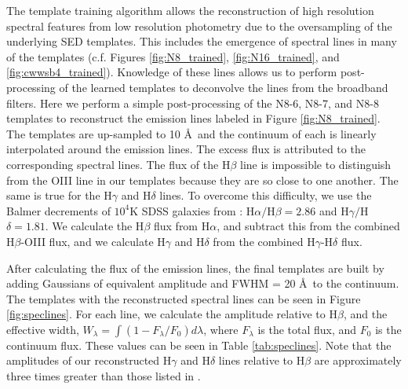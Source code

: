The template training algorithm allows the reconstruction of high resolution spectral features from low resolution photometry due to the oversampling of the underlying SED templates.
This includes the emergence of spectral lines in many of the templates (c.f. Figures \ref{fig:N8_trained}, \ref{fig:N16_trained}, and \ref{fig:cwwsb4_trained}).
Knowledge of these lines allows us to perform post-processing of the learned templates to deconvolve the lines from the broadband filters.
Here we perform a simple post-processing of the N8-6, N8-7, and N8-8 templates to reconstruct the emission lines labeled in Figure \ref{fig:N8_trained}.
The templates are up-sampled to 10 \AA\ and the continuum of each is linearly interpolated around the emission lines.
The excess flux is attributed to the corresponding spectral lines. 
The flux of the H$\beta$ line is impossible to distinguish from the OIII line in our templates because they are so close to one another.
The same is true for the H$\gamma$ and H$\delta$ lines.
To overcome this difficulty, we use the Balmer decrements of $10^4$K SDSS galaxies from \citet{Groves2012a}: H$\alpha/$H$\beta = 2.86$ and H$\gamma/$H$\delta = 1.81$.
We calculate the H$\beta$ flux from H$\alpha$, and subtract this from the combined H$\beta$-OIII flux, and we calculate H$\gamma$ and H$\delta$ from the combined H$\gamma$-H$\delta$ flux.

After calculating the flux of the emission lines, the final templates are built by adding Gaussians of equivalent amplitude and FWHM = 20 \AA\ to the continuum. 
The templates with the reconstructed spectral lines can be seen in Figure \ref{fig:speclines}.
For each line, we calculate the amplitude relative to H$\beta$, and the effective width, $W_\lambda = \int (1 - F_\lambda/F_0) d\lambda$, where $F_\lambda$ is the total flux, and $F_0$ is the continuum flux.
These values can be seen in Table \ref{tab:speclines}.
Note that the amplitudes of our reconstructed H$\gamma$ and H$\delta$ lines relative to H$\beta$ are approximately three times greater than those listed in \citet{Groves2012a}.

